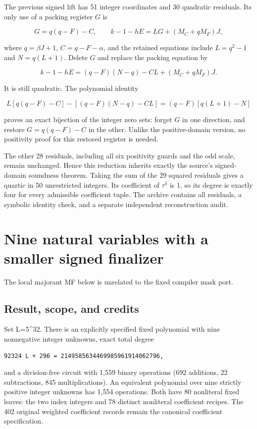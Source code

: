 \documentclass[
  10pt,
]{article}
\begin{document}
The previous signed lift has 51 integer coordinates and 30 quadratic
residuals. Its only use of a packing register \(G\) is

\[G=q(q-F)-C,\qquad
k-1-hE=LG+(M_C+qM_F)J,\]

where \(q=\beta J+1\), \(C=q-F-\alpha\), and the retained equations
include \(L=q^2-1\) and \(N=q(L+1)\). Delete \(G\) and replace the
packing equation by

\[k-1-hE=(q-F)(N-q)-CL+(M_C+qM_F)J.\]

It is still quadratic. The polynomial identity

\[L[q(q-F)-C]-[(q-F)(N-q)-CL]
  =(q-F)[q(L+1)-N]\]

proves an exact bijection of the integer zero sets: forget \(G\) in one
direction, and restore \(G=q(q-F)-C\) in the other. Unlike the
positive-domain version, no positivity proof for this restored register
is needed.

The other 28 residuals, including all six positivity guards and the odd
scale, remain unchanged. Hence this reduction inherits exactly the
source's signed-domain soundness theorem. Taking the sum of the 29
squared residuals gives a quartic in 50 unrestricted integers. Its
coefficient of \(\tau^4\) is 1, so its degree is exactly four for every
admissible coefficient tuple. The archive contains all residuals, a
symbolic identity check, and a separate independent reconstruction
audit.

\section{Nine natural variables with a smaller signed
finalizer}\label{nine-natural-variables-with-a-smaller-signed-finalizer}

The local majorant MF below is unrelated to the fixed compiler mask
port.

\subsection{Result, scope, and credits}\label{result-scope-and-credits}

Set L=5\^{}32. There is an explicitly specified fixed polynomial with
nine nonnegative integer unknowns, exact total degree

\begin{verbatim}
92324 L + 296 = 2149585634469985961914062796,
\end{verbatim}

and a division-free circuit with 1,559 binary operations (692 additions,
22 subtractions, 845 multiplications). An equivalent polynomial over
nine strictly positive integer unknowns has 1,554 operations. Both have
80 nonliteral fixed leaves: the two index integers and 78 distinct
nonliteral coefficient recipes. The 402 original weighted coefficient
records remain the canonical coefficient specification.
\end{document}
